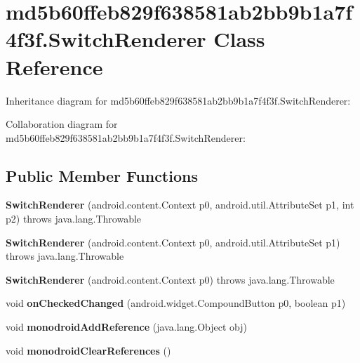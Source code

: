 \hypertarget{classmd5b60ffeb829f638581ab2bb9b1a7f4f3f_1_1_switch_renderer}{}\section{md5b60ffeb829f638581ab2bb9b1a7f4f3f.\+Switch\+Renderer Class Reference}
\label{classmd5b60ffeb829f638581ab2bb9b1a7f4f3f_1_1_switch_renderer}


Inheritance diagram for md5b60ffeb829f638581ab2bb9b1a7f4f3f.\+Switch\+Renderer\+:


Collaboration diagram for md5b60ffeb829f638581ab2bb9b1a7f4f3f.\+Switch\+Renderer\+:
\subsection*{Public Member Functions}
\begin{DoxyCompactItemize}
\item 
\mbox{\label{classmd5b60ffeb829f638581ab2bb9b1a7f4f3f_1_1_switch_renderer_a832f5f93ae7ecd3f08aedc1037692738}} 
{\bfseries Switch\+Renderer} (android.\+content.\+Context p0, android.\+util.\+Attribute\+Set p1, int p2)  throws java.\+lang.\+Throwable 	
\item 
\mbox{\label{classmd5b60ffeb829f638581ab2bb9b1a7f4f3f_1_1_switch_renderer_a6aa5634ceb38e4e6ba17fd3174fe2903}} 
{\bfseries Switch\+Renderer} (android.\+content.\+Context p0, android.\+util.\+Attribute\+Set p1)  throws java.\+lang.\+Throwable 	
\item 
\mbox{\label{classmd5b60ffeb829f638581ab2bb9b1a7f4f3f_1_1_switch_renderer_aecb9a4aa4555f192e24f464151495b5d}} 
{\bfseries Switch\+Renderer} (android.\+content.\+Context p0)  throws java.\+lang.\+Throwable 	
\item 
\mbox{\label{classmd5b60ffeb829f638581ab2bb9b1a7f4f3f_1_1_switch_renderer_acb3eb70920f926f8b36888ee849e7ab7}} 
void {\bfseries on\+Checked\+Changed} (android.\+widget.\+Compound\+Button p0, boolean p1)
\item 
\mbox{\label{classmd5b60ffeb829f638581ab2bb9b1a7f4f3f_1_1_switch_renderer_a028e2f4c76a4c1f2172e7e22c873f457}} 
void {\bfseries monodroid\+Add\+Reference} (java.\+lang.\+Object obj)
\item 
\mbox{\label{classmd5b60ffeb829f638581ab2bb9b1a7f4f3f_1_1_switch_renderer_a88c5734750b36ec1ff059a1db489262c}} 
void {\bfseries monodroid\+Clear\+References} ()
\end{DoxyCompactItemize}
